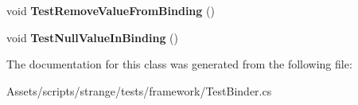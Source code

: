 \begin{DoxyCompactItemize}
\item 
\hypertarget{classstrange_1_1unittests_1_1_test_binder_ad38f873c56d3e63d68194ce114b22732}{void {\bfseries Test\-Remove\-Value\-From\-Binding} ()}\label{classstrange_1_1unittests_1_1_test_binder_ad38f873c56d3e63d68194ce114b22732}

\item 
\hypertarget{classstrange_1_1unittests_1_1_test_binder_a4c71d9fac7587f3e39af6f98c20efaa0}{void {\bfseries Test\-Null\-Value\-In\-Binding} ()}\label{classstrange_1_1unittests_1_1_test_binder_a4c71d9fac7587f3e39af6f98c20efaa0}

\end{DoxyCompactItemize}


The documentation for this class was generated from the following file\-:\begin{DoxyCompactItemize}
\item 
Assets/scripts/strange/tests/framework/Test\-Binder.\-cs\end{DoxyCompactItemize}
